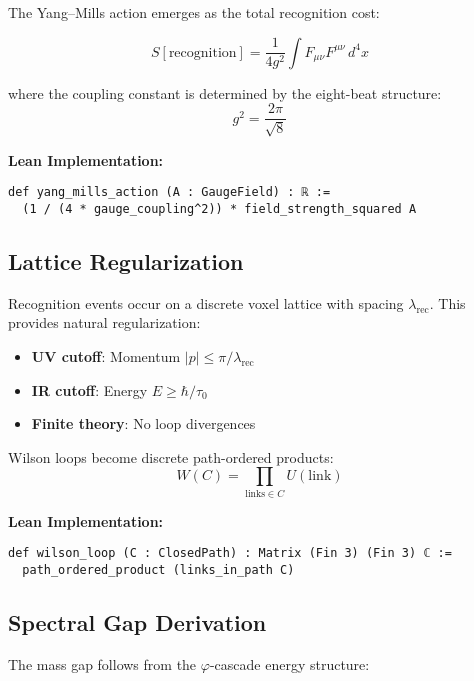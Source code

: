 \documentclass[11pt]{amsart}
\newcommand{\lambdarec}{\lambda_{\text{rec}}}
\newcommand{\taunaught}{\tau_0}
\begin{document}
The Yang--Mills action emerges as the total recognition cost:

\begin{equation}
S[\text{recognition}] = \frac{1}{4g^2} \int F_{\mu\nu} F^{\mu\nu} \, d^4x
\end{equation}

where the coupling constant is determined by the eight-beat structure:
\begin{equation}
g^2 = \frac{2\pi}{\sqrt{8}}
\end{equation}

\textbf{Lean Implementation:}
\begin{lstlisting}
def yang_mills_action (A : GaugeField) : ℝ :=
  (1 / (4 * gauge_coupling^2)) * field_strength_squared A
\end{lstlisting}

\subsection{Lattice Regularization}

Recognition events occur on a discrete voxel lattice with spacing $\lambdarec$. This provides natural regularization:

\begin{itemize}
\item \textbf{UV cutoff}: Momentum $|p| \leq \pi/\lambdarec$
\item \textbf{IR cutoff}: Energy $E \geq \hbar/\taunaught$  
\item \textbf{Finite theory}: No loop divergences
\end{itemize}

Wilson loops become discrete path-ordered products:
\begin{equation}
W(C) = \prod_{\text{links} \in C} U(\text{link})
\end{equation}

\textbf{Lean Implementation:}
\begin{lstlisting}
def wilson_loop (C : ClosedPath) : Matrix (Fin 3) (Fin 3) ℂ :=
  path_ordered_product (links_in_path C)
\end{lstlisting}

\subsection{Spectral Gap Derivation}

The mass gap follows from the $\varphi$-cascade energy structure:
\end{document}
